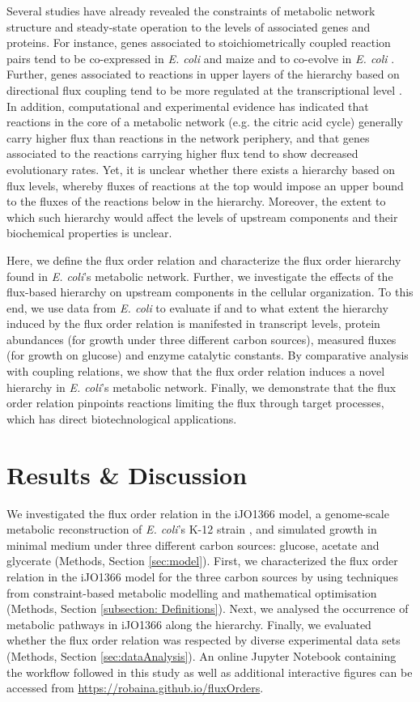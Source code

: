 \documentclass[12pt]{article}
\begin{document}
Several studies have already revealed the constraints of metabolic network structure and steady-state operation to the levels of associated genes and proteins.  For instance, genes associated to stoichiometrically coupled reaction pairs tend to be co-expressed in \emph{E. coli}\cite{Notebaart2008} and maize \cite{Robaina-Estevez2016} and to co-evolve in \emph{E. coli} \cite{Pal2005}. Further, genes associated to reactions in upper layers of the hierarchy based on directional flux coupling tend to be more regulated at the transcriptional level \cite{Hosseini2015}. In addition, computational and experimental evidence has indicated that reactions in the core of a metabolic network (e.g. the citric acid cycle) generally carry higher flux than reactions in the network periphery, and that genes associated to the reactions carrying higher flux tend to show decreased evolutionary rates\cite{Vitkup2006a}. Yet, it is unclear whether there exists a hierarchy based on flux levels, whereby fluxes of reactions at the top would impose an upper bound to the fluxes of the reactions below in the hierarchy. Moreover, the extent to which such hierarchy would affect the levels of upstream components and their biochemical properties is unclear.

Here, we define the flux order relation and characterize the flux order hierarchy found in \emph{E. coli}'s metabolic network. Further, we investigate the effects of the flux-based hierarchy on upstream components in the cellular organization. To this end, we use data from \emph{E. coli} to evaluate if and to what extent the hierarchy induced by the flux order relation is manifested in transcript levels, protein abundances (for growth under three different carbon sources), measured fluxes (for growth on glucose) and enzyme catalytic constants. By comparative analysis with coupling relations, we show that the flux order relation induces a novel hierarchy in \emph{E. coli}'s metabolic network.  Finally, we demonstrate that the flux order relation pinpoints reactions limiting the flux through target processes, which has direct biotechnological applications.

\section{Results \& Discussion}
We investigated the flux order relation in the iJO1366 model, a genome-scale metabolic reconstruction of \emph{E. coli}'s K-12 strain \cite{Orth2014}, and simulated growth in minimal medium under three different carbon sources: glucose, acetate and glycerate (Methods, Section \ref{sec:model}). First, we characterized the flux order relation in the iJO1366 model for the three carbon sources by using techniques from constraint-based metabolic modelling and mathematical optimisation (Methods, Section \ref{subsection: Definitions}). Next, we analysed the occurrence of metabolic pathways in iJO1366 along the hierarchy. Finally, we evaluated whether the flux order relation was respected by diverse experimental data sets (Methods, Section \ref{sec:dataAnalysis}). An online Jupyter Notebook containing the workflow followed in this study as well as additional interactive figures can be accessed from \url{https://robaina.github.io/fluxOrders}.
\end{document}
